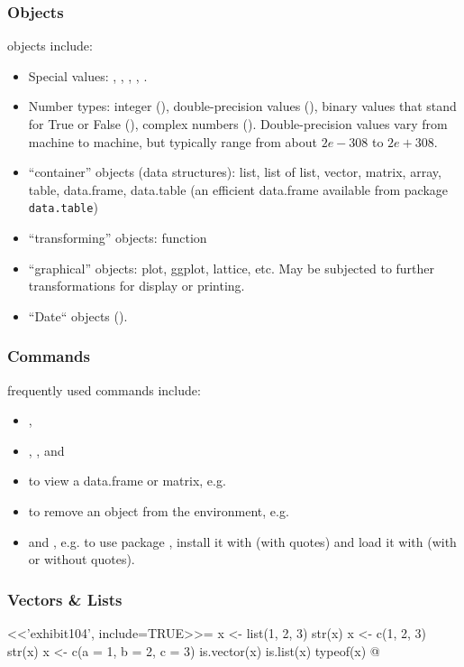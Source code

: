 \begin{frame}[fragile]
\frametitle{\Rlogo Objects}
\Rlogo objects include:
\begin{itemize}
\item Special values: , , , , .
\item Number types: integer (), double-precision values (), binary values that stand for True or False (), complex numbers (). Double-precision values vary from machine to machine, but typically range from about $2e-308$ to $2e+308$.
\item ``container'' objects (data structures):  list, list of list, vector, matrix, array, table, data.frame, data.table (an efficient data.frame available from package \texttt{data.table})
\item ``transforming'' objects: function
\item ``graphical'' objects: plot, ggplot, lattice, etc. May be subjected to further transformations for display or printing.
\item ``Date`` objects ().
\end{itemize}
\end{frame}


\begin{frame}[fragile]
\frametitle{\Rlogo Commands}
\Rlogo frequently used commands include:
\begin{itemize}
\item {}, 
\item {}, ,  and 
\item {} to view a data.frame or matrix, e.g. 
\item {} to remove an object from the environment, e.g. 
\item {} and , e.g. to use package , install it with  (with quotes) and load it with  (with or without quotes).
\end{itemize}
\end{frame}


\begin{frame}[fragile]%
\frametitle{Vectors \& Lists}
<<'exhibit104', include=TRUE>>=
  x <- list(1, 2, 3)
  str(x)
  x <- c(1, 2, 3)
  str(x)
  x <- c(a = 1, b = 2, c = 3)
  is.vector(x)
  is.list(x)
  typeof(x)
@
\end{frame}



